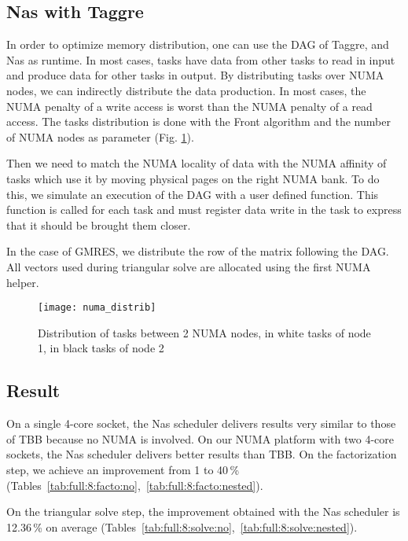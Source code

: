 \subsection{Nas with Taggre}
In order to optimize memory distribution, one can use the DAG of Taggre, and
Nas as runtime.
In most cases, tasks have data from other tasks to read in input and produce data
for other tasks in output. By distributing tasks over NUMA nodes, we can indirectly distribute
the data production. In most cases, the NUMA penalty of a write access is worst than
the NUMA penalty of a read access. The tasks distribution is done with the Front algorithm
and the number of NUMA nodes as parameter (Fig. \ref{fig:distrib_numa}).

Then we need to match the NUMA locality of data with the NUMA affinity of tasks which use it
by moving physical pages on the right NUMA bank.
To do this, we simulate an execution of the DAG with a user defined function. This
function is called for each task and must register data write in the
task to express that it should be brought them closer. 

In the case of GMRES, we distribute the row of the matrix following the DAG. All
vectors used during triangular solve are allocated using the first NUMA helper.


\begin{figure}[!t]
  \centering
  \texttt{[image: numa\_distrib]}
  \caption{Distribution of tasks between 2 NUMA nodes, in white tasks of node 1, in black tasks of node 2}
  \label{fig:distrib_numa}
\end{figure}

\subsection{Result}
On a single 4-core socket, the Nas scheduler delivers results very similar to those
of TBB because no NUMA is involved. On our NUMA platform with two 4-core sockets,
the Nas scheduler delivers better results than TBB. On the
factorization step, we achieve an improvement
from 1 to 40\,\% (Tables~\ref{tab:full:8:facto:no},~\ref{tab:full:8:facto:nested}).

On the triangular solve step, the
improvement obtained with the Nas scheduler is 12.36\,\% on average
(Tables~\ref{tab:full:8:solve:no},~\ref{tab:full:8:solve:nested}). 

